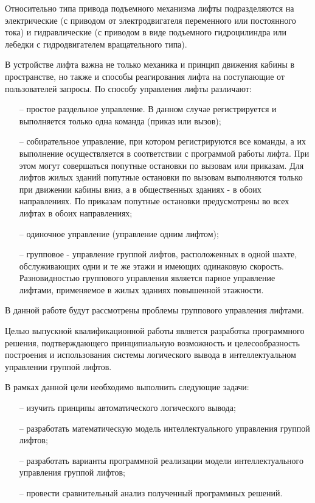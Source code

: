	Относительно типа привода подъемного механизма лифты подразделяются на электрические
		(с приводом от электродвигателя пе­ременного или постоянного тока)
		и гидравлические (с приводом в виде подъемного гидроцилиндра или лебедки с гидродвига­телем вращательного типа).

	В устройстве лифта важна не только механика и принцип движения кабины в пространстве,
		но также и способы реагирования лифта на поступающие от пользователей запросы.
		По способу управления лифты различают:
		\begin{itemize}
			\changefontsizes[28pt]{14pt}
			\item[--] простое раздельное управление. В данном случае регистрируется
				и выполняется только одна команда (приказ или вызов);
			\item[--] собирательное управление, при котором регистрируются все команды,
				а их выполнение осуществляется в соответствии с программой работы лифта.
				При этом могут совершаться попутные остановки по вызовам или приказам.
				Для лифтов жилых зданий попутные остановки по вызовам выполняются только
				при движении кабины вниз, а в общественных зданиях - в обоих направлениях.
				По приказам попутные остановки предусмотрены во всех лифтах в обоих направлениях;
			\item[--] одиночное управление (управление одним лифтом);
			\item[--] групповое - управление группой лифтов, расположенных в одной шахте,
				обслуживающих одни и те же этажи и имеющих одинаковую скорость.
				Разновидностью группового управления является парное управление лифтами,
				применяемое в жилых зданиях повышенной этажности.
			\vspace{-14pt}
		\end{itemize}

	В данной работе будут рассмотрены проблемы группового управления лифтами.

	Целью выпускной квалификационной работы является разработка программного решения,
		подтверждающего принципиальную возможность и целесообразность построения
		и использования системы логического вывода в интеллектуальном управлении группой лифтов.

	В рамках данной цели необходимо выполнить следующие задачи:
		\begin{itemize}
			\changefontsizes[14pt]{14pt}
			\item[--] изучить принципы автоматического логического вывода;
			\item[--] разработать математическую модель интеллектуального управления группой лифтов;
			\item[--] разработать варианты программной реализации модели интеллектуального управления группой лифтов;
			\item[--] провести сравнительный анализ полученный программных решений.
			\vspace{-14pt}
		\end{itemize}
